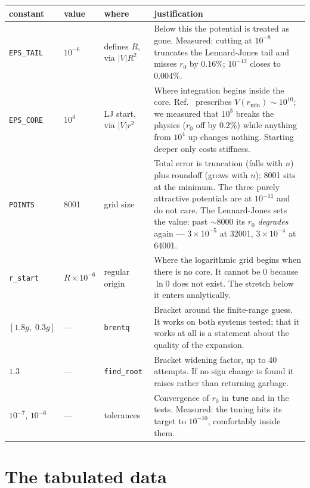 \documentclass[11pt,a4paper]{article}
\begin{document}
\begin{center}
\begin{tabular}{lll p{6.3cm}}
\toprule
\textbf{constant} & \textbf{value} & \textbf{where} & \textbf{justification} \\
\midrule
\texttt{EPS\_TAIL} & $10^{-6}$ & defines $R$, via $|V|R^2$ &
  Below this the potential is treated as gone. Measured: cutting at $10^{-8}$
  truncates the Lennard-Jones tail and misses $r_0$ by $0.16\%$; $10^{-12}$
  closes to $0.004\%$. \\
\addlinespace
\texttt{EPS\_CORE} & $10^{4}$ & LJ start, via $|V|r^2$ &
  Where integration begins inside the core. Ref.~\cite{rbef} prescribes
  $V(r_{\min}) \sim 10^{10}$; we measured that $10^{3}$ breaks the physics
  ($r_0$ off by $0.2\%$) while anything from $10^{4}$ up changes nothing.
  Starting deeper only costs stiffness. \\
\addlinespace
\texttt{POINTS} & 8001 & grid size &
  Total error is truncation (falls with $n$) plus roundoff (grows with $n$);
  8001 sits at the minimum. The three purely attractive potentials are at $10^{-11}$ and
  do not care. The Lennard-Jones sets the value: past $\sim$8000 its $r_0$
  \emph{degrades} again --- $3\times10^{-5}$ at 32001, $3\times10^{-4}$ at
  64001. \\
\addlinespace
\texttt{r\_start} & $R\times10^{-6}$ & regular origin &
  Where the logarithmic grid begins when there is no core. It cannot be $0$
  because $\ln 0$ does not exist. The stretch below it enters analytically. \\
\addlinespace
$[1.8g,\;0.3g]$ & --- & \texttt{brentq} &
  Bracket around the finite-range guess. It works on both systems tested; that
  it works at all is a statement about the quality of the expansion. \\
\addlinespace
$1.3$ & --- & \texttt{find\_root} &
  Bracket widening factor, up to 40 attempts. If no sign change is found it
  raises rather than returning garbage. \\
\addlinespace
$10^{-7}$, $10^{-6}$ & --- & tolerances &
  Convergence of $r_0$ in \texttt{tune} and in the tests. Measured: the tuning
  hits its target to $10^{-10}$, comfortably inside them. \\
\bottomrule
\end{tabular}
\end{center}

\section{The tabulated data}
\label{sec:data}
\end{document}
